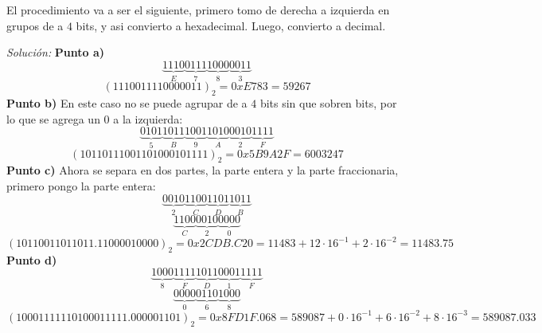 \documentclass{article}
\newenvironment{solution}
    {\textit{Solución:}}
    {}
\begin{document}
El procedimiento va a ser el siguiente, primero tomo de derecha a izquierda en grupos de a $4$ bits, y asi convierto a hexadecimal. Luego, convierto a decimal.

\begin{solution}
\textbf{Punto a)}
\begin{equation*}
    \underbrace{1110}_{E}\underbrace{0111}_{7}\underbrace{1000}_{8}\underbrace{0011}_{3}
\end{equation*}
\begin{equation*}
    (1110011110000011)_2 = 0xE783 = 59267
\end{equation*}
\textbf{Punto b)}
En este caso no se puede agrupar de a $4$ bits sin que sobren bits, por lo que se agrega un $0$ a la izquierda:
\begin{equation*}
    \underbrace{0101}_{5}\underbrace{1011}_{B}\underbrace{1001}_{9}\underbrace{1010}_{A}\underbrace{0010}_{2}\underbrace{1111}_{F}
\end{equation*}
\begin{equation*}
    (10110111001101000101111)_2 = 0x5B9A2F = 6003247
\end{equation*}
\textbf{Punto c)}
Ahora se separa en dos partes, la parte entera y la parte fraccionaria, primero pongo la parte entera:
\begin{equation*}
    \underbrace{0010}_{2}\underbrace{1100}_{C}\underbrace{1101}_{D}\underbrace{1011}_{B}
\end{equation*}
\begin{equation*}
    \underbrace{1100}_{C}\underbrace{0010}_{2}\underbrace{0000}_{0}
\end{equation*}
\begin{equation*}
    (10110011011011.11000010000)_2 = 0x2CDB.C20 = 11483 + 12\cdot 16^{-1} + 2\cdot 16^{-2} = 11483.75
\end{equation*}
\textbf{Punto d)}
\begin{equation*}
    \underbrace{1000}_{8}\underbrace{1111}_{F}\underbrace{1011}_{D}\underbrace{0001}_{1}\underbrace{1111}_{F}
\end{equation*}
\begin{equation*}
    \underbrace{0000}_{0}\underbrace{0110}_{6}\underbrace{1000}_{8}
\end{equation*}
\begin{equation*}
    (10001111110100011111.000001101)_2 = 0x8FD1F.068 = 589087 + 0\cdot 16^{-1} + 6\cdot 16^{-2} + 8 \cdot 16^{-3} = 589087.033
\end{equation*}
\end{solution}
\end{document}
